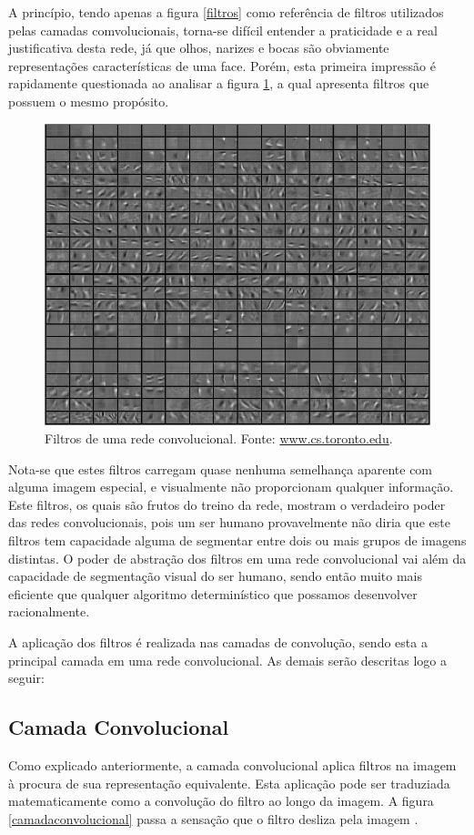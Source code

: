 \documentclass[
	12pt,				%
	oneside,			%
	a4paper,			%
	english,			%
	french,				%
	spanish,			%
	brazil,				%
	]{abntex2}
\begin{document}
A princípio, tendo apenas a figura \ref{filtros} como referência de filtros utilizados pelas camadas comvolucionais, torna-se difícil entender a praticidade e a real justificativa desta rede, já que olhos, narizes e bocas são obviamente representações características de uma face. Porém, esta primeira impressão é rapidamente questionada ao analisar a figura \ref{filtros2}, a qual apresenta filtros que possuem o mesmo propósito.

\begin{figure}[H]
	\centering
	\includegraphics[width=.5\textwidth]{imagens/filtros2}
	\caption{Filtros de uma rede convolucional. Fonte: \href{www.cs.toronto.edu}{www.cs.toronto.edu}.}
	\label{filtros2}
\end{figure} 

Nota-se que estes filtros carregam quase nenhuma semelhança aparente com alguma imagem especial, e visualmente não proporcionam qualquer informação. Este filtros, os quais são frutos do treino da rede, mostram o verdadeiro poder das redes convolucionais, pois um ser humano provavelmente não diria que este filtros tem capacidade alguma de segmentar entre dois ou mais grupos de imagens distintas. O poder de abstração dos filtros em uma rede convolucional vai além da capacidade de segmentação visual do ser humano, sendo então muito mais eficiente que qualquer algoritmo determinístico que possamos desenvolver racionalmente.

A aplicação dos filtros é realizada nas camadas de convolução, sendo esta a principal camada em uma rede convolucional. As demais serão descritas logo a seguir:

\subsection{Camada Convolucional}
Como explicado anteriormente, a camada convolucional aplica filtros na imagem à procura de sua representação equivalente. Esta aplicação pode ser traduziada matematicamente como a convolução do filtro ao longo da imagem. A figura \ref{camadaconvolucional} passa a sensação que o filtro desliza pela imagem \cite{ref3}.
\end{document}
